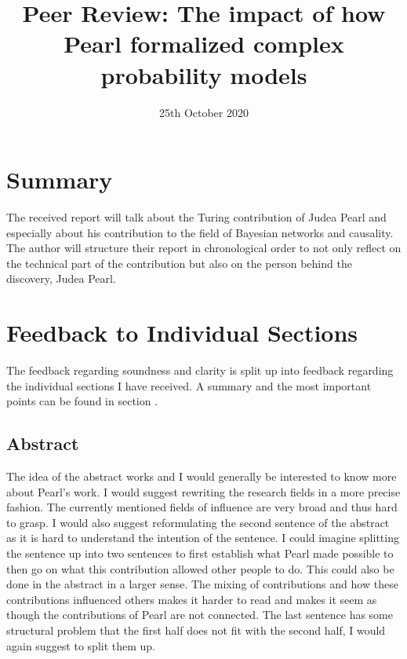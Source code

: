 \documentclass{article}
\title{Peer Review: The impact of how Pearl formalized complex probability models}
\date{25th October 2020}
\begin{document}
\maketitle

\section{Summary}
The received report will talk about the Turing contribution of Judea Pearl and especially about his contribution to the field of Bayesian networks and causality. The author will structure their report in chronological order to not only reflect on the technical part of the contribution but also on the person behind the discovery, Judea Pearl.

\section{Feedback to Individual Sections}
The feedback regarding soundness and clarity is split up into feedback regarding the individual sections I have received. A summary and the most important points can be found in section .

\subsection{Abstract}
The idea of the abstract works and I would generally be interested to know more about Pearl's work. I would suggest rewriting the research fields in a more precise fashion. The currently mentioned fields of influence are very broad and thus hard to grasp. I would also suggest reformulating the second sentence of the abstract as it is hard to understand the intention of the sentence. I could imagine splitting the sentence up into two sentences to first establish what Pearl made possible to then go on what this contribution allowed other people to do. This could also be done in the abstract in a larger sense. The mixing of contributions and how these contributions influenced others makes it harder to read and makes it seem as though the contributions of Pearl are not connected. The last sentence has some structural problem that the first half does not fit with the second half, I would again suggest to split them up.
\end{document}
